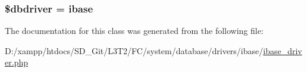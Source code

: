 \subsubsection[{\$dbdriver}]{\setlength{\rightskip}{0pt plus 5cm}\$dbdriver = \textquotesingle{}ibase\textquotesingle{}}\label{class_c_i___d_b__ibase__driver_a0cde2a16322a023d040aa7f725877597}


The documentation for this class was generated from the following file\+:\begin{DoxyCompactItemize}
\item 
D\+:/xampp/htdocs/\+S\+D\+\_\+\+Git/\+L3\+T2/\+F\+C/system/database/drivers/ibase/\hyperlink{ibase__driver_8php}{ibase\+\_\+driver.\+php}\end{DoxyCompactItemize}
